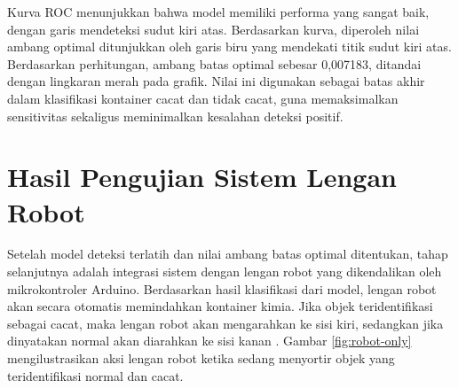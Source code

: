 Kurva ROC menunjukkan bahwa model memiliki performa yang sangat baik,
dengan garis mendeteksi sudut kiri atas. Berdasarkan kurva, diperoleh
nilai ambang optimal ditunjukkan oleh garis biru yang mendekati titik
sudut kiri atas. Berdasarkan perhitungan, ambang batas optimal
sebesar 0,007183, ditandai dengan lingkaran merah pada grafik. Nilai
ini digunakan sebagai batas akhir dalam klasifikasi kontainer cacat
dan tidak cacat, guna memaksimalkan sensitivitas sekaligus
meminimalkan kesalahan deteksi positif.

\vspace{1em}

\section{Hasil Pengujian Sistem Lengan Robot}

Setelah model deteksi terlatih dan nilai ambang batas optimal
ditentukan, tahap selanjutnya adalah integrasi sistem dengan lengan
robot yang dikendalikan oleh mikrokontroler Arduino. Berdasarkan
hasil klasifikasi dari model, lengan robot  akan secara otomatis
memindahkan kontainer kimia. Jika objek teridentifikasi sebagai
cacat, maka lengan robot akan mengarahkan ke sisi kiri, sedangkan
jika dinyatakan normal akan diarahkan ke sisi kanan . Gambar
\ref{fig:robot-only} mengilustrasikan aksi lengan robot
ketika sedang menyortir objek yang teridentifikasi normal dan cacat.

